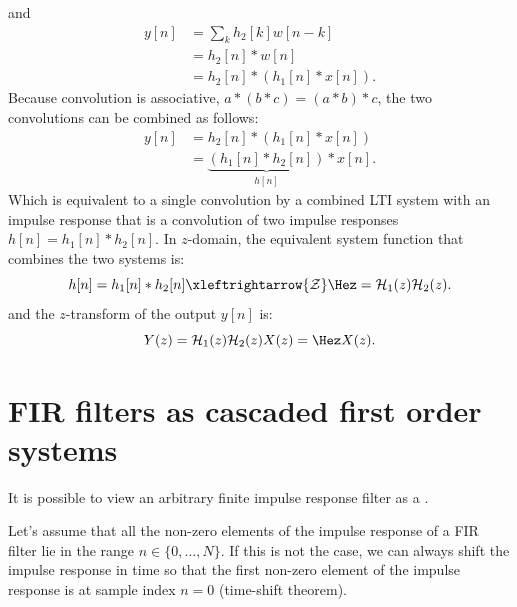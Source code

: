 \begin{marginfigure}
\begin{center}
\end{center}
\end{marginfigure}
\noindent and
\begin{align}
  y[n] &= \sum_k h_2[k]w[n-k] \\
  &= h_2[n]*w[n] \\
  &= h_2[n]*(h_1[n]*x[n]).
\end{align}
Because convolution is associative, $a*(b*c) =(a*b)*c$, the two
convolutions can be combined as follows:
\begin{align}
y[n] &= h_2[n]*(h_1[n]*x[n])\\
 &= \underbrace{(h_1[n]*h_2[n])}_{h[n]} *x[n].
\end{align}
Which is equivalent to a single convolution by a combined LTI system
with an impulse response that is a convolution of two impulse
responses $h[n]=h_1[n]*h_2[n]$. In $z$-domain, the equivalent system
function that combines the two systems is:
\begin{equation}
h[n] = h_1[n] * h_2[n] \xleftrightarrow{\mathcal{Z}} \Hez = \mathcal{H}_1(z) \mathcal{H}_2(z).
\end{equation}
and the $z$-transform of the output $y[n]$ is:
\begin{equation}
Y(z) = \mathcal{H}_1(z)\mathcal{H}_2(z) X(z) = \Hez X(z).
\end{equation}

\section{FIR filters as cascaded first order systems}
It is possible to view an arbitrary finite impulse response filter as
a .

Let's assume that all the non-zero elements of the impulse response
of a FIR filter lie in the range $n \in \{0,\hdots,N\}$. If this is not the
case, we can always shift the impulse response in time so that the
first non-zero element of the impulse response is at sample index
$n=0$ (time-shift theorem).

